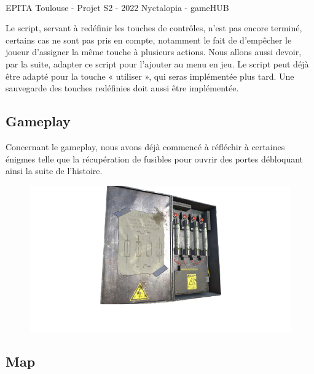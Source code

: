 \vfill
\noindent\makebox[\linewidth]{\rule{.8\paperwidth}{.6pt}}\\[0.2cm]
EPITA Toulouse - Projet S2 - 2022 \hfill Nyctalopia - gameHUB
\noindent\makebox[\linewidth]{\rule{.8\paperwidth}{.6pt}}

\newpage

Le script, servant à redéfinir les touches de contrôles, n’est pas encore terminé, certains cas ne sont pas pris en compte, notamment le fait de d’empêcher le joueur d’assigner la même touche à plusieurs actions. Nous allons aussi devoir, par la suite, adapter ce script pour l’ajouter au menu en jeu. Le script peut déjà être adapté pour la touche « utiliser », qui seras implémentée plus tard.
Une sauvegarde des touches redéfinies doit aussi être implémentée.

\subsection{Gameplay}

Concernant le gameplay, nous avons déjà commencé à réfléchir à certaines énigmes telle que la récupération de fusibles pour ouvrir des portes débloquant ainsi la suite de l’histoire.
\newline

\begin{figure}[H]
\centering
\begin{minipage}{.5\textwidth}
  \centering
  \centerline{\includegraphics[width=1.5\linewidth]{img/assets/fusibles.png}}
  \label{fig:fusebox}
\end{minipage}%
\end{figure}

\subsection{Map}

